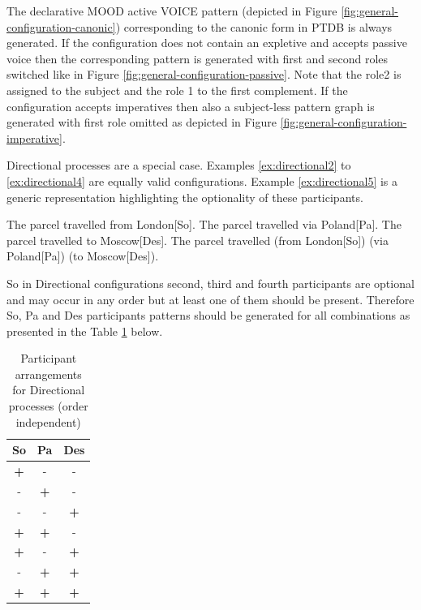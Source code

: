 The declarative MOOD active VOICE pattern (depicted in Figure \ref{fig:general-configuration-canonic}) corresponding to the canonic form in PTDB is always generated. If the configuration does not contain an expletive and accepts passive voice then the corresponding pattern is generated with first and second roles switched like in Figure \ref{fig:general-configuration-passive}. Note that the role2 is assigned to the subject and the role 1 to the first complement. If the configuration accepts imperatives then also a subject-less pattern graph is generated with first role omitted as depicted in Figure \ref{fig:general-configuration-imperative}. 

Directional processes are a special case. Examples \ref{ex:directional2} to \ref{ex:directional4} are equally valid configurations. Example \ref{ex:directional5} is a generic representation highlighting the optionality of these participants. 
\begin{exe}
	\ex\label{ex:directional2} The parcel travelled from London[So].
	\ex\label{ex:directional3} The parcel travelled via Poland[Pa].
	\ex\label{ex:directional4} The parcel travelled to Moscow[Des].
	\ex\label{ex:directional5} The parcel travelled (from London[So]) (via Poland[Pa]) (to Moscow[Des]).
\end{exe}

So in Directional configurations second, third and fourth participants are optional and may occur in any order but at least one of them should be present. Therefore So, Pa and Des participants patterns should be generated for all combinations as presented in the Table \ref{tab:directional-partic-variations} below.

\begin{table}[H]
	\centering
	\begin{tabular}{|c|c|c|}
		\hline
		\textbf{So} & \textbf{Pa} & \textbf{Des} \\ \hline
		\textbf{+} & - & - \\ \hline
		- & \textbf{+} & - \\ \hline
		- & - & \textbf{+} \\ \hline
		\textbf{+} & \textbf{+} & - \\ \hline
		\textbf{+} & - & \textbf{+} \\ \hline
		- & \textbf{+} & \textbf{+} \\ \hline
		\textbf{+} & \textbf{+} & \textbf{+} \\ \hline
	\end{tabular}
	\caption{Participant arrangements for Directional processes (order independent)}
	\label{tab:directional-partic-variations}
\end{table}

